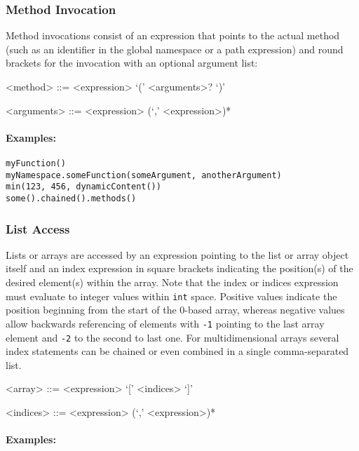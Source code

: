 \documentclass[11pt,a4paper,portrait]{article}
\begin{document}
\subsubsection{Method Invocation}
\label{sec:method-invocations}

Method invocations consist of an expression that points to the actual method (such as an identifier in the global namespace or a path expression) and round brackets for the invocation with an optional argument list:
\begin{grammar}	
	<method> ::= <expression> `(' <arguments>? `)'
	
	<arguments> ::= <expression> (`,' <expression>)*
\end{grammar}

\paragraph{Examples:}

\begin{verbatim}
myFunction()
myNamespace.someFunction(someArgument, anotherArgument)
min(123, 456, dynamicContent())
some().chained().methods()
\end{verbatim}

\subsubsection{List Access}
\label{sec:list-access}

Lists or arrays are accessed by an expression pointing to the list or array object itself and an index expression in square brackets indicating the position(s) of the desired element(s) within the array. Note that the index or indices expression must evaluate to integer values within \texttt{int} space. Positive values indicate the position beginning from the start of the 0-based array, whereas negative values allow backwards referencing of elements with \texttt{-1} pointing to the last array element and \texttt{-2} to the second to last one. For multidimensional arrays several index statements can be chained or even combined in a single comma-separated list.

\begin{grammar}	
	<array> ::= <expression> `[' <indices> `]'
	
	<indices> ::= <expression> (`,' <expression>)*
\end{grammar}

\paragraph{Examples:}
\end{document}
